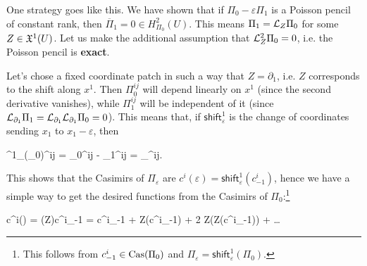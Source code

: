 \documentclass[main.tex]{subfiles}
\begin{document}
\begin{construction}
	One strategy goes like this. We have shown that if $\Pi_0-\varepsilon\Pi_1$ is a Poisson pencil of constant rank, then $\overline \Pi_1 = 0 \in H_{\Pi_0}^2(U)$. This means $\Pi_1 = \mathcal{L}_{Z}\Pi_0$ for some $Z \in \mathfrak{X}^1(U)$. Let us make the additional assumption that $\mathcal{L}_{Z}^2\Pi_0 = 0$, i.e. the Poisson pencil is \textbf{exact}.

	Let's chose a fixed coordinate patch in such a way that $Z = \partial_1$, i.e. $Z$ corresponds to the shift along $x^1$. Then $\Pi_0^{ij}$ will depend linearly on $x^1$ (since the second derivative vanishes), while $\Pi_1^{ij}$ will be independent of it (since $\mathcal{L}_{\partial_1} \Pi_1 = \mathcal{L}_{\partial_1}\mathcal{L}_{\partial_1}\Pi_0 = 0$). This means that, if $\mathsf{shift}^1_\varepsilon$ is the change of coordinates sending $x_1$ to $x_1 - \varepsilon$, then
	\begin{eqalign}
		^1_\varepsilon(\Pi_0)^{ij} = \Pi_0^{ij} - \varepsilon \Pi_1^{ij} = \Pi_\varepsilon^{ij}.
	\end{eqalign}
	This shows that the Casimirs of $\Pi_\varepsilon$ are $c^i(\varepsilon) = \mathsf{shift}^1_\varepsilon(c^i_{-1})$, hence we have a simple way to get the desired functions from the Casimirs of $\Pi_0$:\footnote{This follows from $c_{-1}^i\in\mathrm{Cas}(\Pi_0)$ and $\Pi_\varepsilon = \mathsf{shift}^1_\varepsilon(\Pi_0)$.}
	\begin{eqalign}
		c^i(\varepsilon) = \exp(\varepsilon Z)c^i_{-1} = c^i_{-1} + \varepsilon Z(c^i_{-1}) + 2 Z(Z(c^i_{-1})) + \ldots
	\end{eqalign}
\end{construction}
\end{document}
